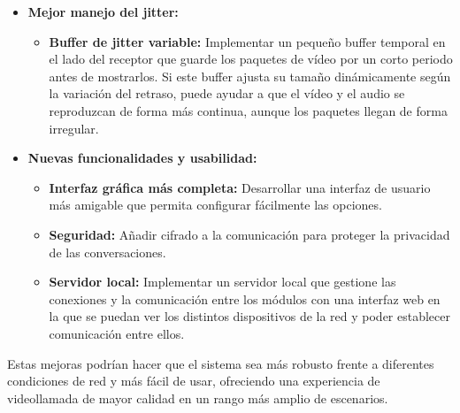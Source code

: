 \begin{itemize}
\item \textbf{Mejor manejo del jitter:}
\begin{itemize}
    \item \textbf{Buffer de jitter variable:} Implementar un pequeño buffer temporal en el lado del receptor que guarde los paquetes de vídeo por un corto periodo antes de mostrarlos. Si este buffer ajusta su tamaño dinámicamente según la variación del retraso, puede ayudar a que el vídeo y el audio se reproduzcan de forma más continua, aunque los paquetes llegan de forma irregular.
\end{itemize}

\item \textbf{Nuevas funcionalidades y usabilidad:}
\begin{itemize}
    \item \textbf{Interfaz gráfica más completa:} Desarrollar una interfaz de usuario más amigable que permita configurar fácilmente las opciones.
    \item \textbf{Seguridad:} Añadir cifrado a la comunicación para proteger la privacidad de las conversaciones.
    \item \textbf{Servidor local:} Implementar un servidor local que gestione las conexiones y la comunicación entre los módulos con una interfaz web en la que se puedan ver los distintos dispositivos de la red y poder establecer comunicación entre ellos.
\end{itemize}
\end{itemize}

Estas mejoras podrían hacer que el sistema sea más robusto frente a diferentes condiciones de red y más fácil de usar, ofreciendo una experiencia de videollamada de mayor calidad en un rango más amplio de escenarios.
